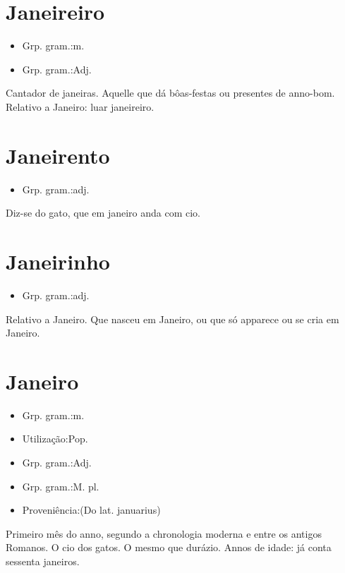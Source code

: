 \documentclass{article}
\begin{document}
\section{Janeireiro}
\begin{itemize}
\item {Grp. gram.:m.}
\end{itemize}
\begin{itemize}
\item {Grp. gram.:Adj.}
\end{itemize}
Cantador de janeiras.
Aquelle que dá bôas-festas ou presentes de anno-bom.
Relativo a Janeiro: \textunderscore luar janeireiro\textunderscore .
\section{Janeirento}
\begin{itemize}
\item {Grp. gram.:adj.}
\end{itemize}
Diz-se do gato, que em janeiro anda com cio.
\section{Janeirinho}
\begin{itemize}
\item {Grp. gram.:adj.}
\end{itemize}
Relativo a Janeiro.
Que nasceu em Janeiro, ou que só apparece ou se cria em Janeiro.
\section{Janeiro}
\begin{itemize}
\item {Grp. gram.:m.}
\end{itemize}
\begin{itemize}
\item {Utilização:Pop.}
\end{itemize}
\begin{itemize}
\item {Grp. gram.:Adj.}
\end{itemize}
\begin{itemize}
\item {Grp. gram.:M. pl.}
\end{itemize}
\begin{itemize}
\item {Proveniência:(Do lat. \textunderscore januarius\textunderscore )}
\end{itemize}
Primeiro mês do anno, segundo a chronologia moderna e entre os antigos Romanos.
O cio dos gatos.
O mesmo que \textunderscore durázio\textunderscore .
Annos de idade: \textunderscore já conta sessenta janeiros\textunderscore .
\end{document}
